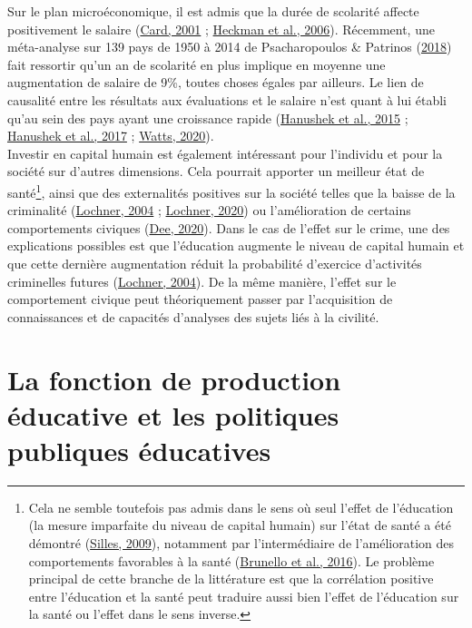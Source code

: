 \documentclass[
]{book}
\begin{document}
Sur le plan microéconomique, il est admis que la durée de scolarité affecte positivement le salaire (\protect\hyperlink{ref-CAR:01}{Card, 2001} ; \protect\hyperlink{ref-HEC:eal:06}{Heckman et al., 2006}). Récemment, une méta-analyse sur 139 pays de 1950 à 2014 de Psacharopoulos \& Patrinos (\protect\hyperlink{ref-PSA:PAT:18}{2018}) fait ressortir qu'un an de scolarité en plus implique en moyenne une augmentation de salaire de 9\%, toutes choses égales par ailleurs.
Le lien de causalité entre les résultats aux évaluations et le salaire n'est quant à lui établi qu'au sein des pays ayant une croissance rapide (\protect\hyperlink{ref-HAN:eal:15}{Hanushek et al., 2015} ; \protect\hyperlink{ref-HAN:eal:17}{Hanushek et al., 2017} ; \protect\hyperlink{ref-WAT:20}{Watts, 2020}).\\
Investir en capital humain est également intéressant pour l'individu et pour la société sur d'autres dimensions. Cela pourrait apporter un meilleur état de santé\footnote{Cela ne semble toutefois pas admis dans le sens où seul l'effet de l'éducation (la mesure imparfaite du niveau de capital humain) sur l'état de santé a été démontré (\protect\hyperlink{ref-SIL:09}{Silles, 2009}), notamment par l'intermédiaire de l'amélioration des comportements favorables à la santé (\protect\hyperlink{ref-BRU:eal:15}{Brunello et al., 2016}). Le problème principal de cette branche de la littérature est que la corrélation positive entre l'éducation et la santé peut traduire aussi bien l'effet de l'éducation sur la santé ou l'effet dans le sens inverse.}, ainsi que des externalités positives sur la société telles que la baisse de la criminalité (\protect\hyperlink{ref-LOC:04}{Lochner, 2004} ; \protect\hyperlink{ref-LOC:20}{Lochner, 2020}) ou l'amélioration de certains comportements civiques (\protect\hyperlink{ref-DEE:20}{Dee, 2020}). Dans le cas de l'effet sur le crime, une des explications possibles est que l'éducation augmente le niveau de capital humain et que cette dernière augmentation réduit la probabilité d'exercice d'activités criminelles futures (\protect\hyperlink{ref-LOC:04}{Lochner, 2004}). De la même manière, l'effet sur le comportement civique peut théoriquement passer par l'acquisition de connaissances et de capacités d'analyses des sujets liés à la civilité.

\hypertarget{la-fonction-de-production-uxe9ducative-et-les-politiques-publiques-uxe9ducatives}{%
\section*{La fonction de production éducative et les politiques publiques éducatives}\label{la-fonction-de-production-uxe9ducative-et-les-politiques-publiques-uxe9ducatives}}
\end{document}
